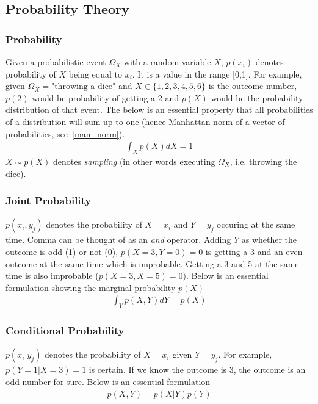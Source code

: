 \documentclass{book}
\numberwithin{equation}{subsection}
\begin{document}
\subsection{Probability Theory}
\subsubsection{Probability}
Given a probabilistic event $\Omega_X$ with a random variable $X$, $p(x_i)$ denotes probability of $X$ being equal to $x_i$. It is a value in the range [0,1]. For example, given $\Omega_X=\text{"throwing a dice"}$ and $X \in \{1,2,3,4,5,6\}$ is the outcome number, $p(2)$ would be probability of getting a $2$ and $p(X)$ would be the probability distribution of that event. The below is an essential property that all probabilities of a distribution will sum up to one (hence Manhattan norm of a vector of probabilities, see~\ref{man_norm}).
\begin{align}
    \int_X p(X)dX = 1
\end{align}
$X \sim p(X)$ denotes \textit{sampling} (in other words executing $\Omega_X$, i.e. throwing the dice).
\subsubsection{Joint Probability}
$p(x_i, y_j)$ denotes the probability of $X=x_i$ and $Y=y_j$ occuring at the same time. Comma can be thought of as an \textit{and} operator. Adding $Y$ as whether the outcome is odd (1) or not (0), $p(X=3,Y=0)=0$ is getting a 3 and an even outcome at the same time which is improbable. Getting a 3 and 5 at the same time is also improbable ($p(X=3,X=5)=0)$. Below is an essential formulation showing the marginal probability $p(X)$
\begin{align}
    \int_Y p(X,Y)dY = p(X)
\end{align}
\subsubsection{Conditional Probability}
$p(x_i|y_j)$ denotes the probability of $X=x_i$ given $Y=y_j$. For example, $p(Y=1|X=3)=1$ is certain. If we know the outcome is 3, the outcome is an odd number for sure. Below is an essential formulation
\begin{align}
    p(X,Y) = p(X|Y)p(Y)
    \label{joint_cond_prob}
\end{align}
\end{document}
